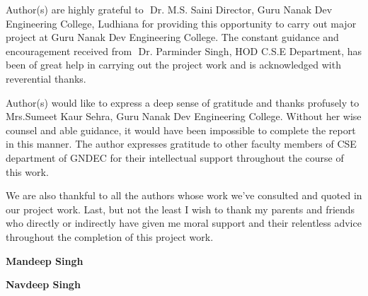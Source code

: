 \begin{Large}
\end{Large}
\vskip 0.1in Author(s) are highly grateful to ​
Dr. M.S. Saini Director, Guru Nanak Dev Engineering  
College, Ludhiana for providing this opportunity to carry out major project at Guru Nanak  
Dev Engineering College. The constant guidance and encouragement received from ​
Dr. Parminder Singh, HOD C.S.E Department, has been of great help in carrying out the project work and is acknowledged with reverential thanks.

Author(s) would like to express a deep sense of gratitude and thanks profusely to ​Mrs.Sumeet Kaur Sehra, Guru Nanak Dev Engineering College. Without her wise counsel and able guidance, it would have been impossible to complete the report in this manner. The author expresses gratitude to other faculty members of CSE department of GNDEC for their intellectual support throughout the course of this work.

We are also thankful to all the authors whose work we’ve consulted and quoted in our project work. Last, but not the least I wish to thank my parents and friends who directly or indirectly have given me moral support and their relentless advice throughout the completion of this project work. 

\vskip 0.4in
\noindent \textbf{Mandeep Singh}

\vskip 0.3in
\noindent \textbf{Navdeep Singh}
